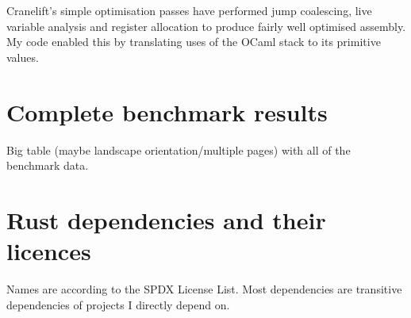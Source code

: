 Cranelift's simple optimisation passes have performed jump coalescing, live variable analysis and
register allocation
to produce fairly well optimised assembly. My code enabled this by translating uses of the OCaml
stack to its primitive values.

\chapter{Complete benchmark results}

Big table (maybe landscape orientation/multiple pages) with all of the benchmark data.

\chapter{Rust dependencies and their licences} \label{appendix-licence}

Names are according to the SPDX License List. Most dependencies are transitive dependencies
of projects I directly depend on.

